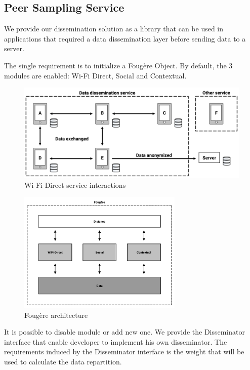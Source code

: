 \subsection{Peer Sampling Service}


We provide our dissemination solution as a library that can be used in applications that required a data dissemination layer before sending data to a server.

The single requirement is to initialize a Foug\`ere Object.
By default, the 3 modules are enabled: Wi-Fi Direct, Social and Contextual.

\begin{figure}[h]
	\centering
	\includegraphics[width=\textwidth]{figures/wifidirect}
	\caption{\label{WiFiDiServInt} Wi-Fi Direct service interactions}
\end{figure}



\begin{figure}[h]
	\centering
	\includegraphics[width=0.7\textwidth]{figures/fougere}
	\caption{\label{Fougere} Foug\`ere architecture}
\end{figure}

It is possible to disable module or add new one.
We provide the Disseminator interface that enable developer to implement his own disseminator.
The requirements induced by the Disseminator interface is the weight that will be used to calculate the data repartition.